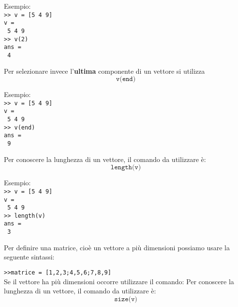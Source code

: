 Esempio: \\
\texttt{>> v = [5 4 9]} \\
\texttt{v = } \\
\texttt{\hspace{0.5cm} 5 \hspace{0.5cm} 4 \hspace{0.5cm} 9} \\
\texttt{>> v(2)} \\
\texttt{ans = } \\
\texttt{\hspace{0.5cm} 4} \break

Per selezionare invece l'\textbf{ultima} componente di un vettore si utilizza
$$ \texttt{v(end)} $$

Esempio: \\
\texttt{>> v = [5 4 9]} \\
\texttt{v = } \\
\texttt{\hspace{0.5cm} 5 \hspace{0.5cm} 4 \hspace{0.5cm} 9} \\
\texttt{>> v(end)} \\
\texttt{ans = } \\
\texttt{\hspace{0.5cm} 9} \break

Per conoscere la lunghezza di un vettore, il comando da utilizzare è:
$$\texttt{length(v)} $$

Esempio: \\
\texttt{>> v = [5 4 9]} \\
\texttt{v = } \\
\texttt{\hspace{0.5cm} 5 \hspace{0.5cm} 4 \hspace{0.5cm} 9} \\
\texttt{>> length(v)} \\
\texttt{ans = } \\
\texttt{\hspace{0.5cm} 3} \break


Per definire una matrice, cioè un vettore a più dimensioni possiamo usare la seguente sintassi:

\texttt{>>matrice = [1,2,3;4,5,6;7,8,9]} \\

Se il vettore ha più dimensioni occorre utilizzare il comando:
Per conoscere la lunghezza di un vettore, il comando da utilizzare è:
$$\texttt{size(v)} $$

